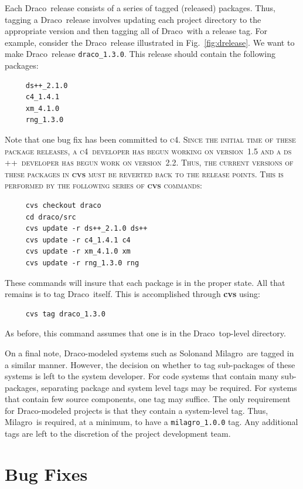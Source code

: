 \documentclass[11pt]{nmemo}
\newcommand{\draco}{\normalfont\normalsize\textsf Draco}
\newcommand{\milagro}{\normalfont\normalsize\textsf Milagro}
\newcommand{\solon}{\normalfont\normalsize\textsf Solon}
\newcommand{\cfour}{\normalfont\normalsize\scshape c\small 4}
\newcommand{\dsxx}{\normalfont\normalsize\scshape ds\raisebox{.2ex}
  {\scriptsize ++}}
\begin{document}
Each \draco\ release consists of a series of tagged (released)
packages.  Thus, tagging a \draco\ release involves updating each
project directory to the appropriate version and then tagging all of
\draco\ with a release tag.  For example, consider the \draco\ release 
illustrated in Fig.~\ref{fig:drelease}.  We want to make \draco\
release \texttt{draco\_1.3.0}.  This release should contain the
following packages:
\begin{verbatim}
     ds++_2.1.0
     c4_1.4.1
     xm_4.1.0
     rng_1.3.0
\end{verbatim}
Note that one bug fix has been committed to \cfour.  Since the initial
time of these package releases, a \cfour\ developer has begun working
on version~1.5 and a \dsxx\ developer has begun work on version~2.2.
Thus, the current versions of these packages in {\bf cvs} must be
reverted back to the release points. This is performed by the
following series of {\bf cvs} commands:
\begin{verbatim}
     cvs checkout draco
     cd draco/src
     cvs update -r ds++_2.1.0 ds++
     cvs update -r c4_1.4.1 c4
     cvs update -r xm_4.1.0 xm
     cvs update -r rng_1.3.0 rng
\end{verbatim}
These commands will insure that each package is in the proper state.
All that remains is to tag \draco\ itself.  This is accomplished
through {\bf cvs} using:
\begin{verbatim}
     cvs tag draco_1.3.0
\end{verbatim}
As before, this command assumes that one is in the \draco\ top-level
directory.  

On a final note, \draco-modeled systems such as \solon and \milagro\
are tagged in a similar manner.  However, the decision on whether to
tag sub-packages of these systems is left to the system developer.
For code systems that contain many sub-packages, separating package
and system level tags may be required.  For systems that contain few
source components, one tag may suffice.  The only requirement for
\draco-modeled projects is that they contain a system-level tag.
Thus, \milagro\ is required, at a minimum, to have a
\texttt{milagro\_1.0.0} tag.  Any additional tags are left to the
discretion of the project development team.


\section{Bug Fixes}
\end{document}
